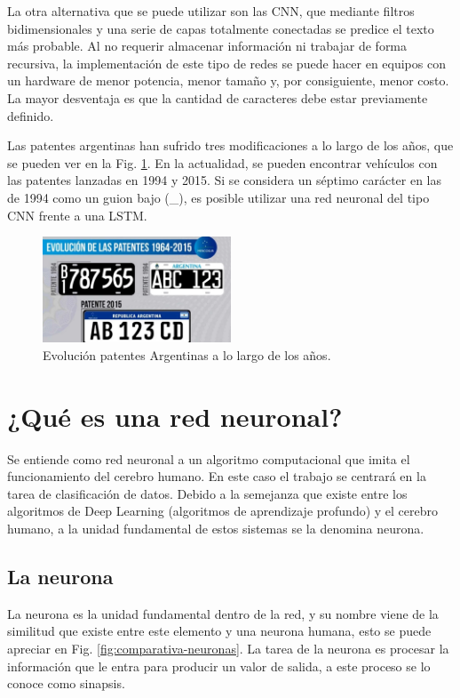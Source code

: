 La otra alternativa que se puede utilizar son las CNN, que mediante filtros bidimensionales y una serie de capas totalmente conectadas se predice el texto más probable.
Al no requerir almacenar información ni trabajar de forma recursiva, la implementación
de este tipo de redes se puede hacer en equipos con un hardware de menor potencia, menor tamaño y, por consiguiente, menor costo. La mayor desventaja es que la cantidad de caracteres debe estar previamente definido.

Las patentes argentinas han sufrido tres modificaciones a lo largo de los años, que se pueden ver en la Fig. \ref{fig:patentes-arg}. En la actualidad, se pueden encontrar vehículos con las patentes lanzadas en 1994 y 2015. Si se considera un séptimo carácter en las de 1994 como un guion bajo (\_), es posible utilizar una red neuronal del tipo CNN frente a una LSTM.
\begin{figure}[bth]
    \centering
    \includegraphics[width=0.5\textwidth]{imgs/patentes-arg.png}
    \caption{Evolución patentes Argentinas a lo largo de los años.}
    \label{fig:patentes-arg}
\end{figure}


\section{¿Qué es una red neuronal?}

Se entiende como red neuronal a un algoritmo computacional que imita el funcionamiento del cerebro humano.
En este caso el trabajo se centrará en la tarea de clasificación de datos.
Debido a la semejanza que existe entre los algoritmos de Deep Learning \cite{ibm_que_nodate} (algoritmos de aprendizaje profundo) y el cerebro humano, a la unidad fundamental de estos sistemas se la denomina neurona.


\subsection{La neurona}

La neurona es la unidad fundamental dentro de la red, y su nombre viene de la similitud que existe entre este elemento y una neurona humana, esto se puede apreciar en Fig. \ref{fig:comparativa-neuronas}. La tarea de la neurona es procesar la información que le entra para producir un valor de salida, a este proceso se lo conoce como sinapsis.

